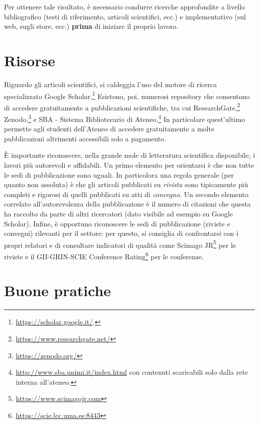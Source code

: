\documentclass[12pt]{report}
\begin{document}
    Per ottenere tale risultato, è necessario condurre ricerche approfondite a livello bibliografico (testi di riferimento, articoli scientifici, ecc.) e implementativo (sul web, sugli store, ecc.) \textbf{prima} di iniziare il proprio lavoro.

    \section{Risorse}

    Riguardo gli articoli scientifici, si caldeggia l'uso del motore di ricerca specializzato Google Scholar.\footnote{\url{https://scholar.google.it/}.} Esistono, poi, numerosi repository che consentono di accedere gratuitamente a pubblicazioni scientifiche, tra cui ResearchGate,\footnote{\url{https://www.researchgate.net/}} Zenodo,\footnote{\url{https://zenodo.org/}} e SBA - Sistema Bibliotecario di Ateneo.\footnote{\url{http://www.sba.unimi.it/index.html} con contenuti scaricabili solo dalla rete interna all'ateneo.} In particolare quest'ultimo permette agli studenti dell'Ateneo di accedere gratuitamente a molte pubblicazioni altrimenti accessibili solo a pagamento.

    \`E importante riconoscere, nella grande mole di letteratura scientifica disponibile, i lavori pi\`u autorevoli e affidabili. Un primo elemento per orientarsi \`e che non tutte le sedi di pubblicazione sono uguali. In particolora una regola generale (per quanto non assoluta) \`e che gli articoli pubblicati su {\em rivista} sono tipicamente pi\`u completi e rigorosi di quelli pubblicati su atti di {\em convegno}. Un secondo elemento correlato all'autorevolezza della pubblicazione \`e il numero di citazioni che questa ha raccolto da parte di altri ricercatori (dato visibile ad esempio su Google Scholar). Infine, \`e opportuno riconoscere le sedi di pubblicazione (riviste e convegni) rilevanti per il settore: per questo, si consiglia di confrontarsi con i propri relatori e di consultare indicatori di qualità come Scimago JR\footnote{\url{https://www.scimagojr.com}} per le riviste e il GII-GRIN-SCIE Conference Rating\footnote{\url{https://scie.lcc.uma.es:8443}} per le conferenze.

    \section{Buone pratiche}
\end{document}
